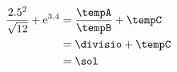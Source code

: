   \DIVIDE{\tempA}{\tempB}{\divisio}
  \ADD{\divisio}{\tempC}{\sol}
\begin{align*}
\frac{2.5^2}{\sqrt{12}}+\mathrm{e}^{3.4}
      &= \frac{\tempA}{\tempB}+\tempC \\
      &= \divisio+\tempC \\
      &=\sol
\end{align*}
